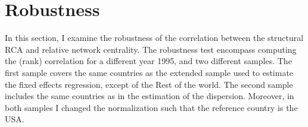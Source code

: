 \section{Robustness}
In this section, I examine the robustness of the correlation between the structural RCA and relative network centrality.  The  robustness test encompass computing the (rank) correlation for a different year 1995, and two different samples. The first sample covers the same countries as the extended sample used to estimate the fixed effects regression, except of the Rest of the world. The second sample includes the same countries as in the estimation of the dispersion. Moreover, in both samples I changed the normalization such that the reference country is the USA.  
\par

